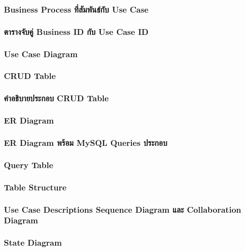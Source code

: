 \subsubsection{Business Process ที่สัมพันธ์กับ Use Case}

\subsubsection{ตารางจับคู่ Business ID กับ Use Case ID}

\subsubsection{Use Case Diagram}

\subsubsection{CRUD Table}

\subsubsection{คำอธิบายประกอบ CRUD Table}

\subsubsection{ER Diagram}

\subsubsection{ER Diagram พร้อม MySQL Queries ประกอบ}

\subsubsection{Query Table}

\subsubsection{Table Structure}

\subsubsection{Use Case Descriptions Sequence Diagram และ Collaboration Diagram}

\subsubsection{State Diagram}

